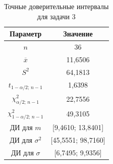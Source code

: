 \begin{table}[H]
\centering
\caption{Точные доверительные интервалы для задачи 3}
\small
\begin{tabular}{cc}
\toprule
Параметр & Значение \\
\midrule
$n$ & 36 \\
$\overline{x}$ & 11,6506 \\
$S^2$ & 64,1813 \\
$t_{1-\alpha/2;\,n-1}$ & 1,6398 \\
$\chi^2_{\alpha/2;\,n-1}$ & 22,7556 \\
$\chi^2_{1-\alpha/2;\,n-1}$ & 49,3105 \\
ДИ для $m$ & [9,4610; 13,8401] \\
ДИ для $\sigma^2$ & [45,5551; 98,7160] \\
ДИ для $\sigma$ & [6,7495; 9,9356] \\
\bottomrule
\end{tabular}
\end{table}
